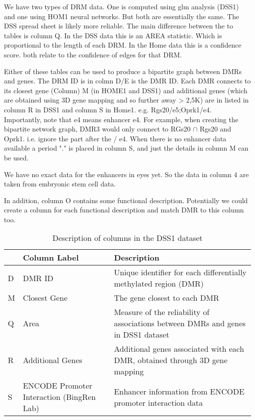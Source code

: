 \documentclass{article}
\begin{document}
We have two types of DRM data. One is computed using glm analysis (DSS1) and one using HOM1 neural networks. But both are essentially the same. The DSS spread sheet is likely more reliable. The main difference between the to tables is column Q. In the DSS data this is an AREA statistic. Which is proportional to the length of each DRM. In the Home data this is a confidence score. both relate to the confidence of edges for that DRM.

Either of these tables can be used to produce a bipartite graph between DMRs and genes.
The DRM ID is in colmn D/E is the DMR ID. Each DMR connects to its closest gene (Column) M (in HOME1 and DSS1) and additional genes (which are obtained using 3D gene mapping and so further away > 2,5K) are in listed in column R in DSS1 and column S in Home1. e.g. Rgs20/e5;Oprk1/e4. Importantly, note that e4 means enhancer e4. For example, when creating the bipartite network graph, DMR3 would only connect to RGs20 $\cap$ Rgs20 and Oprk1. i.e. ignore the part after the / e4. When there is no enhancer data available a period "." is placed in column S, and just the details in column M can be used.

We have no exact data for the enhancers in eyes yet. So the data in column 4 are taken from embryonic stem cell data.

In addition, column O contains some functional description. Potentially we could create a column for each functional description and match DMR to this column too.

\begin{table*}[h]
\centering
\sffamily
\setlength{\tabcolsep}{5pt}
\begin{tabular}
{@{}p{0.6cm}p{3.0cm}p{7.5cm}@{}}
\toprule
& \bf{Column Label} & \bf{Description} \\
\midrule
D & DMR ID & Unique identifier for each differentially methylated region (DMR) \\
M & Closest Gene & The gene closest to each DMR \\
Q & Area & Measure of the reliability of associations between DMRs and genes in DSS1 dataset \\
R & Additional Genes & Additional genes associated with each DMR, obtained through 3D gene mapping \\
S & ENCODE Promoter Interaction (BingRen Lab) & Enhancer information from ENCODE promoter interaction data \\
\bottomrule
\end{tabular}
\caption{Description of columns in the DSS1 dataset}
\label{table:dss1_columns}
\end{table*}
\end{document}
